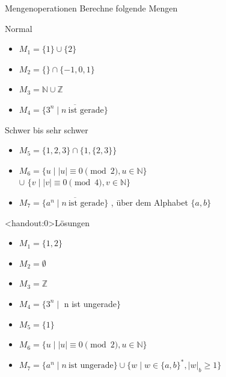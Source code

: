 {
\begin{frame}{Mengenoperationen}
    Berechne folgende Mengen
    \begin{alertblock}{Normal}
        \begin{itemize}
            \item $M_1 = \{1\}\cup \{2\}$
            \item $M_2 = \{\} \cap \{-1, 0, 1\}$
            \item $M_3 = \mathbb{N} \cup \mathbb{Z}$
            \item $M_4 = \overline{\{3^{n}\mid n \ \text{ist gerade}\} }$
        \end{itemize}
    \end{alertblock}
        \begin{alertblock}{Schwer bis sehr schwer}
        \begin{itemize}
            \item $M_5 = \{1, 2, 3\} \cap  \{1, \{2, 3\}\}$
            \item $M_6 = \{u \mid |u| \equiv 0 \pmod 2, u \in \mathbb{N}\}$\\\hspace{0.65cm}$\cup$ $\{v \mid |v| \equiv 0 \pmod 4, v \in \mathbb{N}\}$
            \item $M_7 = \overline{\{a^{n} \mid n \ \text{ist gerade}\} }$ , über dem Alphabet $\{a,b\}$
        \end{itemize}
    \end{alertblock}
\end{frame}

\begin{frame}<handout:0>{Lösungen}
  \begin{itemize}[<+- | alert@+>]
        \item 
            $M_1 = \{1, 2\}$
        \item
            $M_2 = \emptyset$
        \item
            $M_3 = \mathbb{Z}$
        \item
            $M_4 = \{3^{n} \mid$ n ist ungerade$\}$ 
        \item
            $M_5 = \{1\}$
        \item
            $M_6 = \{u \mid |u| \equiv 0 \pmod 2, u \in \mathbb{N}\}$
        \item
            $M_7 = \{a^{n} \mid n \ \text{ist ungerade}\} \cup\{w \mid w\in\{a,b\}^{*}, |w|_b \geq 1\}$
    \end{itemize}
\end{frame}
}
